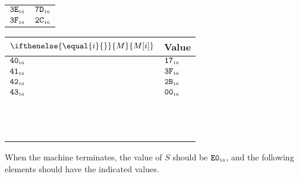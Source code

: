 \documentclass[a4paper,12pt]{article}
\newcommand{\num}[1]{\texttt{#1}}
\newcommand{\hex}[1]{\num{#1}_{\textup{\tiny 16}}}
\newcommand{\MEM}[1]{\ifthenelse{\equal{#1}{}}{M}{M[#1]}}
\newcommand{\SP}{S}
\begin{document}
\begin{center}
\begin{tabular}{@{}ll@{}}
    $\hex{3E}$ & $\hex{7D}$ \\
    $\hex{3F}$ & $\hex{2C}$ \\
    \hline
  \end{tabular}
  \hfil
  \begin{tabular}{@{}ll@{}}
    \hline
    $\MEM{i}$  & Value \\
    \hline
    $\hex{40}$ & $\hex{17}$ \\
    $\hex{41}$ & $\hex{3F}$ \\
    $\hex{42}$ & $\hex{2B}$ \\
    $\hex{43}$ & $\hex{00}$ \\
    \\
    \\
    \\
    \\
    \\
    \\
    \\
    \\
    \\
    \\
    \\
    \\
    \hline
  \end{tabular}
\end{center}

When the machine terminates, the value of $\SP$ should be $\hex{E0}$, and the following elements should have the indicated values.
\end{document}
